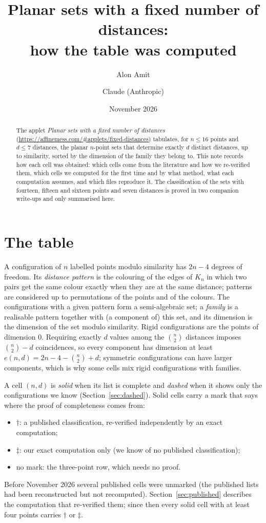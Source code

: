 \documentclass[11pt]{amsart}
\title{Planar sets with a fixed number of distances:\\ how the table was computed}
\author{Alon Amit}
\author{Claude (Anthropic)}
\date{November 2026}
\theoremstyle{remark}
\begin{document}
\begin{abstract}
The applet \emph{Planar sets with a fixed number of distances}
(\url{https://affinemess.com/#applets/fixed-distances}) tabulates, for $n\le16$ points and $d\le7$
distances, the planar $n$-point sets that determine exactly $d$ distinct distances, up to similarity, sorted
by the dimension of the family they belong to. This note records how each cell was obtained: which cells
come from the literature and how we re-verified them, which cells we computed for the first time and by what
method, what each computation assumes, and which files reproduce it. The classification of the sets with
fourteen, fifteen and sixteen points and seven distances is proved in two companion write-ups and only
summarised here.
\end{abstract}

\maketitle

\section{The table}\label{sec:table}

A configuration of $n$ labelled points modulo similarity has $2n-4$ degrees of freedom. Its \emph{distance
pattern} is the colouring of the edges of $K_n$ in which two pairs get the same colour exactly when they are
at the same distance; patterns are considered up to permutations of the points and of the colours. The
configurations with a given pattern form a semi-algebraic set; a \emph{family} is a realisable pattern
together with (a component of) this set, and its dimension is the dimension of the set modulo similarity.
Rigid configurations are the points of dimension $0$. Requiring exactly $d$ values among the $\binom n2$
distances imposes $\binom n2-d$ coincidences, so every component has dimension at least
$e(n,d)=2n-4-\binom n2+d$; symmetric configurations can have larger components, which is why some cells mix
rigid configurations with families.

A cell $(n,d)$ is \emph{solid} when its list is complete and \emph{dashed} when it shows only the
configurations we know (Section~\ref{sec:dashed}). Solid cells carry a mark that says where the proof of
completeness comes from:
\begin{itemize}
\item $\dagger$: a published classification, re-verified independently by an exact computation;
\item $\ddagger$: our exact computation only (we know of no published classification);
\item no mark: the three-point row, which needs no proof.
\end{itemize}
Before November 2026 several published cells were unmarked (the published lists had been reconstructed but
not recomputed). Section~\ref{sec:published} describes the computation that re-verified them; since then
every solid cell with at least four points carries $\dagger$ or $\ddagger$.
\end{document}
